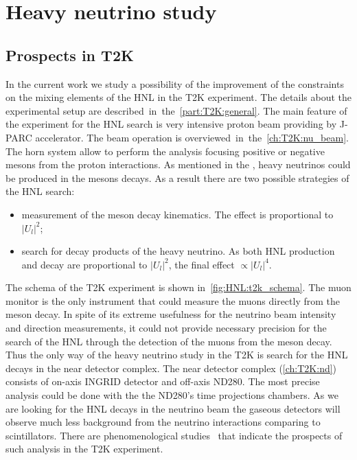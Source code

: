 \documentclass[../main.tex]{subfiles}
\begin{document}
\renewcommand{\labelitemi}{\ding{226}}
\renewcommand{\labelitemii}{\ding{227}}

\part{Heavy neutrino study}

\chapter{Prospects in T2K}


In the current work we study a possibility of the improvement of the constraints on the mixing elements of the HNL in the T2K experiment. The details about the experimental setup are described~in~the~\autoref{part:T2K:general}. The main feature of the experiment for the HNL search is very intensive proton beam providing by J-PARC accelerator. The beam operation is overviewed~in~the~\autoref{ch:T2K:nu_beam}. The horn system allow to perform the analysis focusing positive or negative mesons from the proton interactions. As mentioned in the , heavy neutrinos could be produced in the mesons decays. As a result there are two possible strategies of the HNL search:
\begin{itemize}
    \item measurement of the meson decay kinematics. The effect is proportional to $\left|U_l\right|^2$;
    \item search for decay products of the heavy neutrino. As both HNL production and decay are proportional to $\left|U_l\right|^2$, the final effect $\propto\left|U_l\right|^4$.
\end{itemize}

The schema of the T2K experiment is shown in~\autoref{fig:HNL:t2k_schema}. The muon monitor is the only instrument that could measure the muons directly from the meson decay. In spite of its extreme usefulness for the neutrino beam intensity and direction measurements, it could not provide necessary precision for the search of the HNL through the detection of the muons from the meson decay. Thus the only way of the heavy neutrino study in the T2K is search for the HNL decays in the near detector complex. The near detector complex (\autoref{ch:T2K:nd}) consists of on-axis INGRID detector and off-axis ND280. The most precise analysis could be done with the the ND280's time projections chambers. As we are looking for the HNL decays in the neutrino beam the gaseous detectors will observe much less background from the neutrino interactions comparing to scintillators. There are phenomenological studies~\cite{Asaka2012} that indicate the prospects of such analysis in the T2K experiment.
\end{document}
